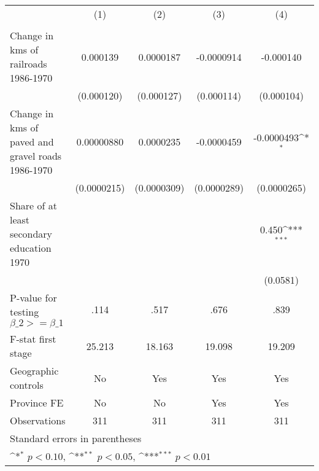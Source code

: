{
\def\sym#1{\ifmmode^{#1}\else\(^{#1}\)\fi}
\begin{tabular}{l*{4}{c}}
\hline\hline
                &\multicolumn{1}{c}{(1)}&\multicolumn{1}{c}{(2)}&\multicolumn{1}{c}{(3)}&\multicolumn{1}{c}{(4)}\\
                &\multicolumn{1}{c}{}&\multicolumn{1}{c}{}&\multicolumn{1}{c}{}&\multicolumn{1}{c}{}\\
\hline
Change in kms of railroads 1986-1970& 0.000139         &0.0000187         &-0.0000914         &-0.000140         \\
                &(0.000120)         &(0.000127)         &(0.000114)         &(0.000104)         \\
[1em]
Change in kms of paved and gravel roads 1986-1970&0.00000880         &0.0000235         &-0.0000459         &-0.0000493\sym{*}  \\
                &(0.0000215)         &(0.0000309)         &(0.0000289)         &(0.0000265)         \\
[1em]
Share of at least secondary education 1970&                  &                  &                  &    0.450\sym{***}\\
                &                  &                  &                  & (0.0581)         \\
\hline
P-value for testing $\beta\_{2} >= \beta\_{1}$&     .114         &     .517         &     .676         &     .839         \\
F-stat first stage&   25.213         &   18.163         &   19.098         &   19.209         \\
Geographic controls&       No         &      Yes         &      Yes         &      Yes         \\
Province FE     &       No         &       No         &      Yes         &      Yes         \\
Observations    &      311         &      311         &      311         &      311         \\
\hline\hline
\multicolumn{5}{l}{\footnotesize Standard errors in parentheses}\\
\multicolumn{5}{l}{\footnotesize \sym{*} \(p<0.10\), \sym{**} \(p<0.05\), \sym{***} \(p<0.01\)}\\
\end{tabular}
}

